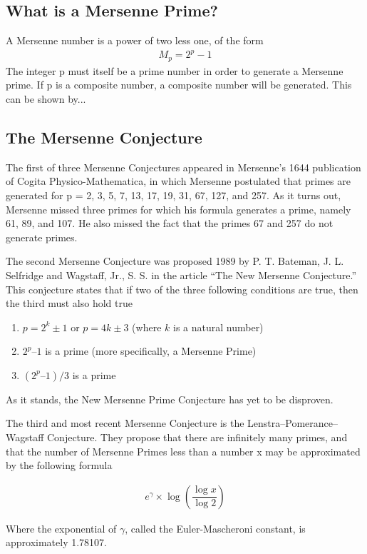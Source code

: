 \subsection{What is a Mersenne Prime?}

A Mersenne number is a power of two less one, of the form
\begin{align}
M_p = 2^p - 1
\end{align}
The integer p must itself be a prime number in order to generate a Mersenne prime. If p is a
composite number, a composite number will be generated. This can be shown by...

\subsection{The Mersenne Conjecture}

The first of three Mersenne Conjectures appeared in Mersenne’s 1644 publication of Cogita
Physico-Mathematica, in which Mersenne postulated that primes are generated for p = 2, 3, 5,
7, 13, 17, 19, 31, 67, 127, and 257. As it turns out, Mersenne missed three primes for which his
formula generates a prime, namely 61, 89, and 107. He also missed the fact that the primes 67
and 257 do not generate primes.

The second Mersenne Conjecture was proposed 1989 by P. T. Bateman, J. L. Selfridge and
Wagstaff, Jr., S. S. in the article “The New Mersenne Conjecture.” This conjecture states that if
two of the three following conditions are true, then the third must also hold true~\cite{utm.edu-newconjecture}

\begin{enumerate}
\item $p = 2^k \pm 1$ or $p = 4k \pm 3$ (where $k$ is a natural number)
\item $2^p – 1$ is a prime (more specifically, a Mersenne Prime)
\item $(2^p – 1)/3$ is a prime
\end{enumerate}

As it stands, the New Mersenne Prime Conjecture has yet to be disproven.

The third and most recent Mersenne Conjecture is the Lenstra–Pomerance–Wagstaff
Conjecture. They propose that there are infinitely many primes, and that the number of
Mersenne Primes less than a number x may be approximated by the following formula~\cite{utm.edu-heuristic}

\begin{align}
e^{\gamma} \times \log \left( \dfrac{\log{x}}{\log{2}} \right)
\end{align}

Where the exponential of $\gamma$, called the Euler-Mascheroni constant, is approximately
1.78107.
